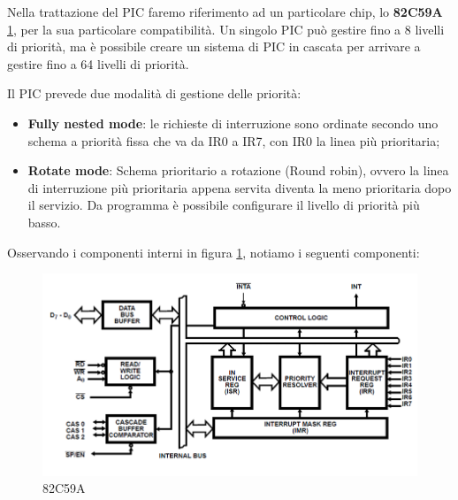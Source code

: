 Nella trattazione del PIC faremo riferimento ad un particolare chip, lo \textbf{82C59A} \ref{img:82C59A}, per la sua particolare compatibilità. Un singolo PIC può gestire fino a 8 livelli di priorità, ma è possibile creare un sistema di PIC in cascata per arrivare a gestire fino a 64 livelli di priorità. 

Il PIC prevede due modalità di gestione delle priorità:
\begin{itemize}
    \item \textbf{Fully nested mode}: le richieste di interruzione sono ordinate secondo uno schema a priorità fissa che va da IR0 a IR7, con IR0 la linea più prioritaria;
    \item \textbf{Rotate mode}: Schema prioritario a rotazione (Round robin), ovvero la linea di interruzione più prioritaria appena servita diventa la meno prioritaria dopo il servizio. Da programma è possibile configurare il livello di priorità più basso.
\end{itemize}

Osservando i componenti interni in figura \ref{img:82C59A}, notiamo i seguenti componenti:

\begin{figure}[ht]
    \centering
    \includegraphics[width=1\textwidth]{img/PIC_82C59A.png}
    \caption{82C59A}
    \label{img:82C59A}
\end{figure}

